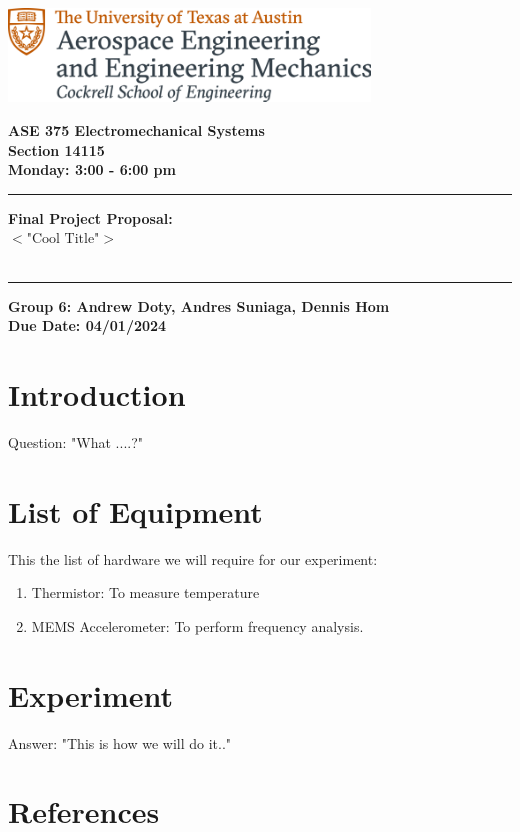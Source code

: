 \documentclass{article}
\begin{document}
\begin{titlepage}
  \centering
  \includegraphics[height=2.5cm]{ase-logo-formal.png}  %
  \vspace{1cm}  %
 
  \Large \textbf{ASE 375 Electromechanical Systems}\\
  \large \textbf{Section 14115}\\
  \vspace{0.5cm}
  \textbf{Monday: 3:00 - 6:00 pm}\\
 
  \vspace{1cm}
 
  \hrule
  \vspace{0.5cm}
 
  \Huge \textbf{Final Project Proposal: \\
                $<\text{"Cool Title"}>$}\\
  \Huge \textbf{}\\
 
  \vspace{0.5cm}
  \hrule
 
  \vspace{1cm}
 
  \normalsize \textbf{Group 6: Andrew Doty, Andres Suniaga, Dennis Hom}\\
  \normalsize \textbf{Due Date: 04/01/2024}
 
\end{titlepage}
\newpage

\section{Introduction}
Question: "What ....?"

\section{List of Equipment}
This the list of hardware we will require for our experiment:
\begin{enumerate}
    \item Thermistor: To measure temperature
    \item MEMS Accelerometer: To perform frequency analysis.
\end{enumerate}

\section{Experiment}
Answer: "This is how we will do it.." 

\section{References}
\end{document}
